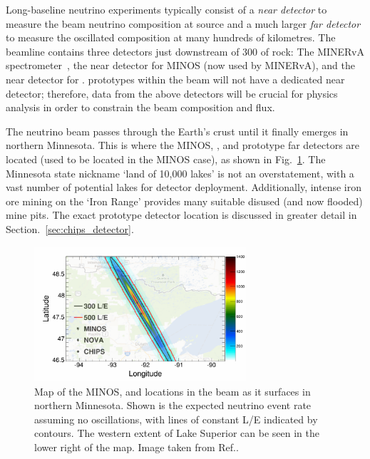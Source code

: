 Long-baseline neutrino experiments typically consist of a \emph{near detector} to measure the beam
neutrino composition at source and a much larger \emph{far detector} to measure the oscillated
composition at many hundreds of kilometres. The \numi beamline contains three detectors just
downstream of \unit{300}{} of rock: The MINERvA spectrometer~\cite{mcfarland2006}, the
near detector for MINOS (now used by MINERvA), and the near detector for \nova. \chips prototypes
within the \numi beam will not have a dedicated near detector; therefore, data from the above
detectors will be crucial for physics analysis in order to constrain the beam composition and
flux.

The \numi neutrino beam passes through the Earth's crust until it finally emerges in northern
Minnesota. This is where the MINOS, \nova, and prototype \chips far detectors are located (used to
be located in the MINOS case), as shown in Fig.~\ref{fig:numi_map}. The Minnesota state nickname
`land of 10,000 lakes' is not an overstatement, with a vast number of potential lakes for \chips
detector deployment. Additionally, intense iron ore mining on the `Iron Range' provides many
suitable disused (and now flooded) mine pits. The exact \chipsfive prototype detector location is
discussed in greater detail in Section.~\ref{sec:chips_detector}.

\begin{figure} %
    \includegraphics[width=0.7\textwidth]{diagrams/4-chips/numi_map.png}
    \caption[Map of detector locations in the \numi beam.]
    {Map of the MINOS, \nova and \chips locations in the \numi beam as it surfaces in northern
        Minnesota. Shown is the expected neutrino event rate assuming no oscillations, with lines
        of constant L/E indicated by contours. The western extent of Lake Superior can be seen in
        the lower right of the map. Image taken from Ref.\cite{adamson2013}.}
    \label{fig:numi_map}
\end{figure}

